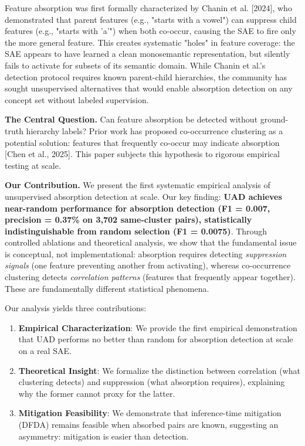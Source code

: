 \documentclass{article}
\begin{document}
Feature absorption was first formally characterized by Chanin et al. [2024], who demonstrated that parent features (e.g., "starts with a vowel") can suppress child features (e.g., "starts with 'a'") when both co-occur, causing the SAE to fire only the more general feature. This creates systematic "holes" in feature coverage: the SAE appears to have learned a clean monosemantic representation, but silently fails to activate for subsets of its semantic domain. While Chanin et al.'s detection protocol requires known parent-child hierarchies, the community has sought unsupervised alternatives that would enable absorption detection on any concept set without labeled supervision.

\textbf{The Central Question.} Can feature absorption be detected without ground-truth hierarchy labels? Prior work has proposed co-occurrence clustering as a potential solution: features that frequently co-occur may indicate absorption [Chen et al., 2025]. This paper subjects this hypothesis to rigorous empirical testing at scale.

\textbf{Our Contribution.} We present the first systematic empirical analysis of unsupervised absorption detection at scale. Our key finding: \textbf{UAD achieves near-random performance for absorption detection (F1 = 0.007, precision = 0.37\% on 3,702 same-cluster pairs), statistically indistinguishable from random selection (F1 = 0.0075)}. Through controlled ablations and theoretical analysis, we show that the fundamental issue is conceptual, not implementational: absorption requires detecting \textit{suppression signals} (one feature preventing another from activating), whereas co-occurrence clustering detects \textit{correlation patterns} (features that frequently appear together). These are fundamentally different statistical phenomena.

Our analysis yields three contributions:
\begin{enumerate}
  \item \textbf{Empirical Characterization}: We provide the first empirical demonstration that UAD performs no better than random for absorption detection at scale on a real SAE.
  \item \textbf{Theoretical Insight}: We formalize the distinction between correlation (what clustering detects) and suppression (what absorption requires), explaining why the former cannot proxy for the latter.
  \item \textbf{Mitigation Feasibility}: We demonstrate that inference-time mitigation (DFDA) remains feasible when absorbed pairs are known, suggesting an asymmetry: mitigation is easier than detection.
\end{enumerate}
\end{document}
